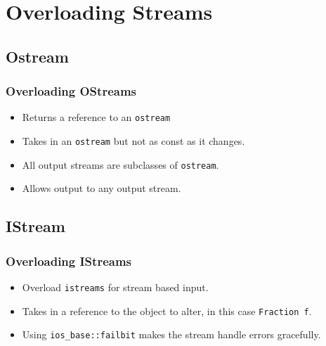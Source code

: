 \documentclass{beamer}
\begin{document}
\section{Overloading Streams}
\subsection{Ostream}
\begin{frame}
\frametitle{Overloading OStreams}
\ostr
\begin{itemize}
\item Returns a reference to an \texttt{ostream}
\item Takes in an \texttt{ostream} but not as const as it changes.
\item All output streams are subclasses of \texttt{ostream}.
\item Allows output to any output stream.
\end{itemize}
\end{frame}
\subsection{IStream}
\begin{frame}
\frametitle{Overloading IStreams}
\istr 
\begin{itemize}
\item Overload \texttt{istreams} for stream based input.
\item Takes in a reference to the object to alter, in this case \texttt{Fraction f}. 
\item Using \texttt{ios\_base::failbit} makes the stream handle errors gracefully.
\end{itemize}
\end{frame}
\end{document}
